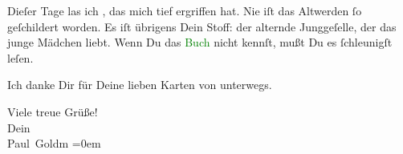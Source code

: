 \pstart
           Dieſer Tage las ich \label{K_L03213-3v}\label{K_L03213-3h}, das mich tief ergriffen hat. Nie iſt das Altwerden ſo geſchildert
               worden. {\pb}Es iſt übrigens Dein Stoff: der alternde
               Junggeſelle, der das junge Mädchen  liebt. Wenn
               Du das \textcolor{green}{Buch}{}\ledrightnote{{$\rightarrow$}\textcolor{green}{Fort comme la mort}} nicht kennſt, mußt
               Du es ſchleunigſt leſen.\pend
           
\pstart
           Ich danke Dir für Deine lieben Karten \strikeout{\textcolor{gray}{aus}} von unterwegs.\pend
           
\pstart
           Viele treue Grüße!{\\[\baselineskip]}Dein{\\[\baselineskip]}\spacefill\mbox{Paul Goldm}\pend
           \leftskip=0em{}\endnumbering{}
\begin{anhang}
\end{anhang}
      